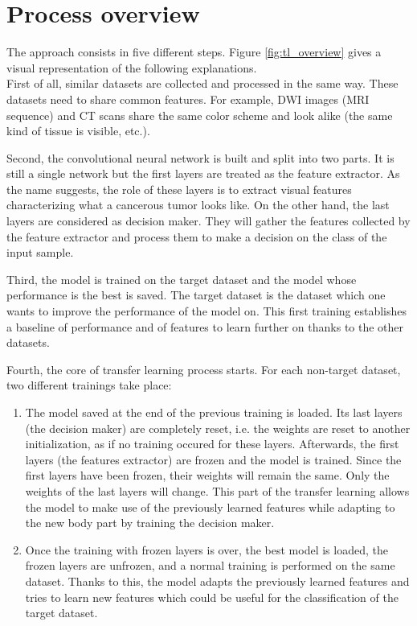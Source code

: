 \section{Process overview}
\label{sec:process_overview}
The approach consists in five different steps. Figure \ref{fig:tl_overview} gives a visual representation of the following explanations.\\
First of all, similar datasets are collected and processed in the same way. These datasets need to share common features. For example, DWI images (MRI sequence) and CT scans share the same color scheme and look alike (the same kind of tissue is visible, etc.). 

Second, the convolutional neural network is built and split into two parts. It is still a single network but the first layers are treated as the feature extractor. As the name suggests, the role of these layers is to extract visual features characterizing what a cancerous tumor looks like. On the other hand, the last layers are considered as decision maker. They will gather the features collected by the feature extractor and process them to make a decision on the class of the input sample. 

Third, the model is trained on the target dataset and the model whose performance is the best is saved. The target dataset is the dataset which one wants to improve the performance of the model on. This first training establishes a baseline of performance and of features to learn further on thanks to the other datasets. 

Fourth, the core of transfer learning process starts. For each non-target dataset, two different trainings take place:

\begin{enumerate}
	\item The model saved at the end of the previous training is loaded. Its last layers (the decision maker) are completely reset, i.e. the weights are reset to another initialization, as if no training occured for these layers. Afterwards, the first layers (the features extractor) are frozen and the model is trained. Since the first layers have been frozen, their weights will remain the same. Only the weights of the last layers will change. This part of the transfer learning allows the model to make use of the previously learned features while adapting to the new body part by training the decision maker. 
	\item Once the training with frozen layers is over, the best model is loaded, the frozen layers are unfrozen, and a normal training is performed on the same dataset. Thanks to this, the model adapts the previously learned features and tries to learn new features which could be useful for the classification of the target dataset. 
\end{enumerate}

